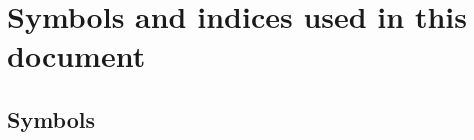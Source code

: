 \documentclass[letterpaper]{article}
\begin{document}
\appendix
\newpage
\section{Symbols and indices used in this document}

\subsection{Symbols}

\renewcommand{\arraystretch}{1.5}
\end{document}
